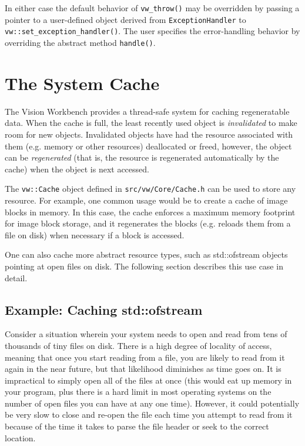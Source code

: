 In either case the default behavior of \verb#vw_throw()# may be
overridden by passing a pointer to a user-defined object derived from
\verb#ExceptionHandler# to \verb#vw::set_exception_handler()#.  The
user specifies the error-handling behavior by overriding the abstract
method \verb#handle()#.

\section{The System Cache}
\label{sec:cache}

The Vision Workbench provides a thread-safe system for caching
regeneratable data.  When the cache is full, the least recently used
object is {\em invalidated} to make room for new objects.  Invalidated
objects have had the resource associated with them (e.g. memory or
other resources) deallocated or freed, however, the object can be {\em
  regenerated} (that is, the resource is regenerated automatically by
the cache) when the object is next accessed.

The \verb#vw::Cache# object defined in \verb#src/vw/Core/Cache.h# can
be used to store any resource.  For example, one common usage would be
to create a cache of image blocks in memory.  In this case, the cache
enforces a maximum memory footprint for image block storage, and it
regenerates the blocks (e.g. reloads them from a file on disk) when
necessary if a block is accessed.  

One can also cache more abstract resource types, such as std::ofstream
objects pointing at open files on disk. The following section
describes this use case in detail.

\subsection{Example: Caching std::ofstream}

Consider a situation wherein your system needs to open and read from
tens of thousands of tiny files on disk.  There is a high degree of
locality of access, meaning that once you start reading from a file,
you are likely to read from it again in the near future, but that
likelihood diminishes as time goes on.  It is impractical to simply
open all of the files at once (this would eat up memory in your
program, plus there is a hard limit in most operating systems on the
number of open files you can have at any one time).  However, it could
potentially be very slow to close and re-open the file each time you
attempt to read from it because of the time it takes to parse the file
header or seek to the correct location.

